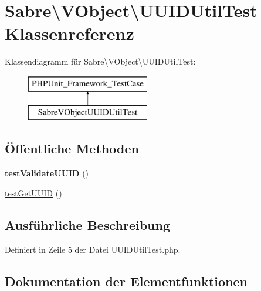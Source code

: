 \hypertarget{class_sabre_1_1_v_object_1_1_u_u_i_d_util_test}{}\section{Sabre\textbackslash{}V\+Object\textbackslash{}U\+U\+I\+D\+Util\+Test Klassenreferenz}
\label{class_sabre_1_1_v_object_1_1_u_u_i_d_util_test}
Klassendiagramm für Sabre\textbackslash{}V\+Object\textbackslash{}U\+U\+I\+D\+Util\+Test\+:\begin{figure}[H]
\begin{center}
\leavevmode
\includegraphics[height=2.000000cm]{class_sabre_1_1_v_object_1_1_u_u_i_d_util_test}
\end{center}
\end{figure}
\subsection*{Öffentliche Methoden}
\begin{DoxyCompactItemize}
\item 
\mbox{\label{class_sabre_1_1_v_object_1_1_u_u_i_d_util_test_af26dd72258a4d6598df21133f950a02e}} 
{\bfseries test\+Validate\+U\+U\+ID} ()
\item 
\mbox{\hyperlink{class_sabre_1_1_v_object_1_1_u_u_i_d_util_test_acc5a83391910e1cd5302a953919142d4}{test\+Get\+U\+U\+ID}} ()
\end{DoxyCompactItemize}


\subsection{Ausführliche Beschreibung}


Definiert in Zeile 5 der Datei U\+U\+I\+D\+Util\+Test.\+php.



\subsection{Dokumentation der Elementfunktionen}
\mbox{\label{class_sabre_1_1_v_object_1_1_u_u_i_d_util_test_acc5a83391910e1cd5302a953919142d4}} 
